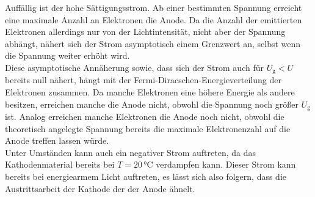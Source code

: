 Auffällig ist der hohe Sättigungsstrom.
Ab einer bestimmten Spannung erreicht eine maximale Anzahl an Elektronen die Anode.
Da die Anzahl der emittierten Elektronen allerdings nur von der Lichtintensität, nicht aber der Spannung abhängt, nähert sich der Strom asymptotisch einem Grenzwert an, selbst wenn die Spannung weiter erhöht wird. \\

Diese asymptotische Annäherung sowie, dass sich der Strom auch für $U_\text{g} < U$ bereits null nähert, hängt mit der Fermi-Diracschen-Energieverteilung der Elektronen zusammen.
Da manche Elektronen eine höhere Energie als andere besitzen, erreichen manche die Anode nicht, obwohl die Spannung noch größer $U_\text{g}$ ist.
Analog erreichen manche Elektronen die Anode noch nicht, obwohl die theoretisch angelegte Spannung bereits die maximale Elektronenzahl auf die Anode treffen lassen würde. \\

Unter Umständen kann auch ein negativer Strom auftreten, da das Kathodenmaterial bereits bei $T = 20 \,\si{\celsius}$ verdampfen kann.
Dieser Strom kann bereits bei energiearmem Licht auftreten, es lässt sich also folgern, dass die Austrittsarbeit der Kathode der der Anode ähnelt.


